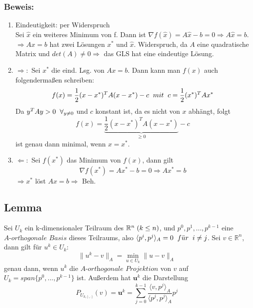 \documentclass{article}
\begin{document}
\subsubsection{Beweis:}
\begin{enumerate}
\item Eindeutigkeit: per Widerspruch
\\Sei $\hat x$ ein weiteres Minimum von f. Dann ist $\nabla f(\hat x) = A\hat x - b = 0 \Rightarrow A\hat x = b$.
\\$\Rightarrow Ax = b$ hat zwei Lösungen $x^{*}$ und $\hat x$. Widerspruch, da $A$ eine quadratische Matrix und $det(A) \ne 0 \Rightarrow $ das GLS hat eine eindeutige Lösung.
\item $\Rightarrow:$ Sei $x^{*}$ die eind. Lsg. von $Ax = b$. Dann kann man $f(x)$ auch folgenderma{\ss}en schreiben:
$$f(x) = \frac 1 2 (x - x^{*})^{T}A(x - x^{*}) - c \hspace{2mm} mit \hspace{2mm} c = \frac 1 2 (x^{*})^{T}Ax^{*}$$
Da $y^{T}Ay > 0 \hspace{2mm} \forall _{y \ne 0}$ und $c$ konstant ist, da es nicht von $x$ abhängt, folgt
$$f(x) = \underbrace {\frac 1 2 (x - x^{*})^{T}A(x - x^{*})}_{\ge 0} - c$$
ist genau dann minimal, wenn $x = x^{*}$.
\item $\Leftarrow:$ Sei $f(x^{*})$ das Minimum von $f(x)$, dann gilt
$$\nabla f(x^{*}) = Ax^{*} - b = 0 \Rightarrow Ax^{*} = b$$
$\Rightarrow x^{*}$ löst $Ax = b \Rightarrow$ Beh.
\end{enumerate}

\subsection{Lemma}
Sei $U_{k}$ ein k-dimensionaler Teilraum des $\mathbb{R}^{n} \hspace{1mm} (k \le n)$, und $p^{0}, p^{1},...,p^{k-1}$ eine $\textit{A-orthogonale Basis}$ dieses Teilraums, also $\langle p^{i}, p^{j} \rangle _{A} = 0 \hspace{2mm} f\ddot{u}r \hspace{2mm} i \ne j$. Sei $v \in \mathbb{R}^{n}$, dann gilt für $u^{k} \in U_{k}$:
\begin{equation}
\|u^{k} - v\|_{A} = \underset{u \in U_{k}}{\min} \|u - v\|_{A}
\end{equation}
genau dann, wenn $u^{k}$ die $\textit{A-orthogonale Projektion}$ von $v$ auf $U_{k} = span\{p^{0},...,p^{k-1}\}$ ist. Außerdem hat $\textbf{u}^{k}$ die Darstellung
\begin{equation}
P_{U_{k,\langle \cdot,\cdot \rangle}}(v) = \textbf{u}^{k} = \sum_{j=0}^{k-1} \frac {\langle v, p^{j} \rangle _{A}} {\langle p^{j}, p^{j} \rangle _{A}} p^{j}
\end{equation}
\end{document}
